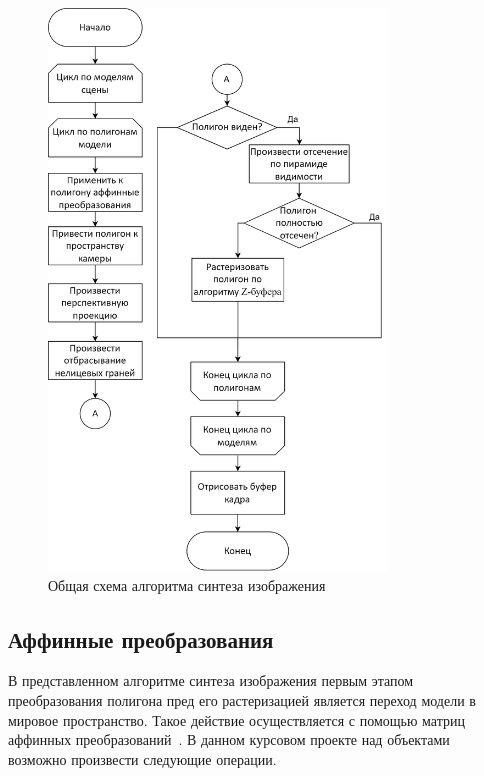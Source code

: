 \begin{figure}[h]
	\centering
	\includegraphics[width=0.8\textwidth]{img/algorithms/alg_scene.png}
	\caption{Общая схема алгоритма синтеза изображения}
	\label{fig:alg_scene}
\end{figure}

\clearpage

\subsection{Аффинные преобразования}

В представленном алгоритме синтеза изображения первым этапом преобразования полигона пред его растеризацией является переход модели в мировое пространство. 
Такое действие осуществляется с помощью матриц аффинных преобразований~\cite{porevcg}.
В данном курсовом проекте над объектами возможно произвести следующие операции.

